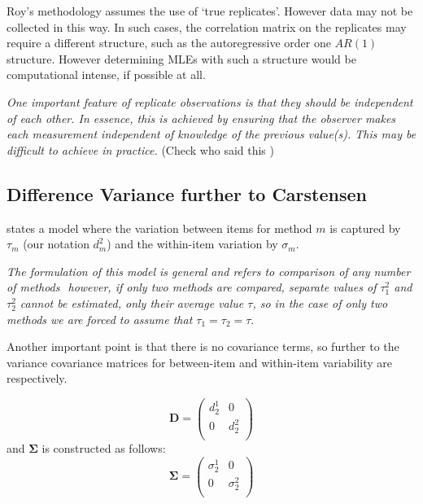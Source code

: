 \documentclass[12pt, a4paper]{report}
\theoremstyle{plain}
\theoremstyle{definition}
\theoremstyle{remark}
\begin{document}
Roy's methodology assumes the use of `true replicates'. However data may not be collected in this way. In such cases, the correlation matrix on the replicates may require a different structure, such as the autoregressive order one $AR(1)$ structure. However determining MLEs with such a structure would be computational intense, if possible at all.


\bigskip

\emph{
	One important feature of replicate observations is that they should be independent
	of each other. In essence, this is achieved by ensuring that the observer makes each
	measurement independent of knowledge of the previous value(s). This may be difficult
	to achieve in practice.} (Check who said this
)

\subsection{Difference Variance further to Carstensen}

\citet{BXC2008} states a model where the variation between items
for method $m$ is captured by $\tau_m$ (our notation $d^2_m$) and the within-item
variation by $\sigma_m$.

\emph{The formulation of this model is general and refers to comparison
	of any number of methods  however, if only two methods are
	compared, separate values of $\tau^2_1$ and $\tau^2_2$ cannot be
	estimated, only their average value $\tau$, so in the case of only
	two methods we are forced to assume that $\tau_1 = \tau_2 = \tau$}\citep{bxc2008}.

Another important point is that there is no covariance terms, so
further to  \citet{bxc2008} the variance covariance matrices for
between-item and within-item variability are respectively.

\[\boldsymbol{D} = \left(
\begin{array}{cc}
d^1_2  & 0 \\
0 & d^2_2 \\
\end{array}
\right) \]
and  $\boldsymbol{\Sigma}$ is constructed as follows:
\[\boldsymbol{\Sigma} = \left(
\begin{array}{cc}
\sigma^1_2  & 0 \\
0 & \sigma^2_2 \\
\end{array}
\right) \]
\end{document}
